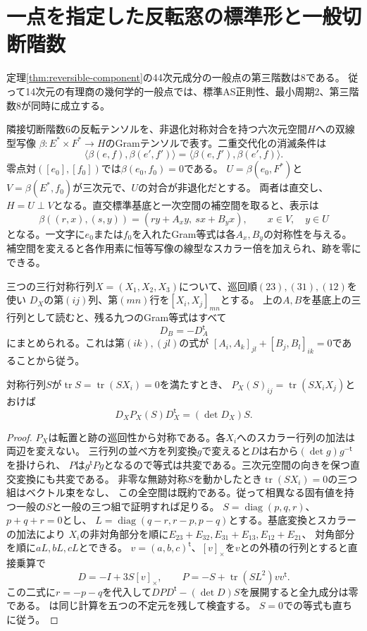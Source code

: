 \section{一点を指定した反転窓の標準形と一般切断階数}
\label{sec:marked-opposite-rank}
\begin{theorem}\label{thm:marked-opposite-eight}
定理\ref{thm:reversible-component}の44次元成分の一般点の第三階数は8である。
従って14次元の有理商の幾何学的一般点では、標準AS正則性、最小周期2、第三階数8が同時に成立する。
\end{theorem}

隣接切断階数6の反転テンソルを、非退化対称対合を持つ六次元空間$H$への双線型写像
$\beta:E^*\times F^*\to H$のGramテンソルで表す。二重交代化の消滅条件は
\[
 \langle\beta(e,f),\beta(e',f')\rangle=\langle\beta(e,f'),\beta(e',f)\rangle .
\]
零点対$([e_0],[f_0])$では$\beta(e_0,f_0)=0$である。
$U=\beta(e_0,F^*)$と$V=\beta(E^*,f_0)$が三次元で、$U$の対合が非退化だとする。
両者は直交し、$H=U\perp V$となる。直交標準基底と一次空間の補空間を取ると、表示は
\[
 \beta((r,x),(s,y))=(r y+A_x y,\ s x+B_y x),\qquad x\in V,\quad y\in U
\]
となる。一文字に$e_0$または$f_0$を入れたGram等式は各$A_x,B_y$の対称性を与える。
補空間を変えると各作用素に恒等写像の線型なスカラー倍を加えられ、跡を零にできる。

三つの三行対称行列$X=(X_1,X_2,X_3)$について、巡回順$(23),(31),(12)$を使い
$D_X$の第$(ij)$列、第$(mn)$行を$[X_i,X_j]_{mn}$とする。
上の$A,B$を基底上の三行列として読むと、残る九つのGram等式はすべて
\[
 D_B=-D_A^{\mathsf t}
\]
にまとめられる。これは第$(ik),(jl)$の式が
$[A_i,A_k]_{jl}+[B_j,B_l]_{ik}=0$であることから従う。

\begin{lemma}[三行の交換子と直交二次式]\label{lem:ternary-net-commutator}
対称行列$S$が$\operatorname{tr}S=\operatorname{tr}(SX_i)=0$を満たすとき、
$P_X(S)_{ij}=\operatorname{tr}(SX_iX_j)$とおけば
\[
 D_X P_X(S) D_X^{\mathsf t}=(\det D_X) S .
\]
\end{lemma}
\begin{proof}
$P_X$は転置と跡の巡回性から対称である。各$X_i$へのスカラー行列の加法は両辺を変えない。
三行列の並べ方を列変換$g$で変えると$D$は右から$(\det g)g^{-\mathsf t}$を掛けられ、
$P$は$g^{\mathsf t}Pg$となるので等式は共変である。三次元空間の向きを保つ直交変換にも共変である。
非零な無跡対称$S$を動かしたとき$\operatorname{tr}(SX_i)=0$の三つ組はベクトル束をなし、
この全空間は既約である。従って相異なる固有値を持つ一般の$S$と一般の三つ組で証明すれば足りる。
$S=\operatorname{diag}(p,q,r)$、$p+q+r=0$とし、
$L=\operatorname{diag}(q-r,r-p,p-q)$とする。基底変換とスカラーの加法により
$X_i$の非対角部分を順に$E_{23}+E_{32},E_{31}+E_{13},E_{12}+E_{21}$、
対角部分を順に$aL,bL,cL$とできる。
$v=(a,b,c)^{\mathsf t}$、$[v]_\times$を$v$との外積の行列とすると直接乗算で
\[
 D=-I+3S[v]_\times,\qquad
 P=-S+\operatorname{tr}(SL^2)vv^{\mathsf t}.
\]
この二式に$r=-p-q$を代入して$DPD^{\mathsf t}-(\det D)S$を展開すると全九成分は零である。
は同じ計算を五つの不定元を残して検査する。
$S=0$での等式も直ちに従う。
\end{proof}

